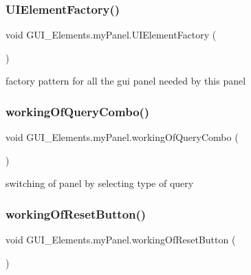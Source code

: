 \subsubsection{\texorpdfstring{U\+I\+Element\+Factory()}{UIElementFactory()}}
{\footnotesize\ttfamily void G\+U\+I\+\_\+\+Elements.\+my\+Panel.\+U\+I\+Element\+Factory (\begin{DoxyParamCaption}{ }\end{DoxyParamCaption})}



factory pattern for all the gui panel needed by this panel 

\hypertarget{class_g_u_i___elements_1_1my_panel_a35817f482730797326227422f83ff9c8}{}\label{class_g_u_i___elements_1_1my_panel_a35817f482730797326227422f83ff9c8} 
\subsubsection{\texorpdfstring{working\+Of\+Query\+Combo()}{workingOfQueryCombo()}}
{\footnotesize\ttfamily void G\+U\+I\+\_\+\+Elements.\+my\+Panel.\+working\+Of\+Query\+Combo (\begin{DoxyParamCaption}{ }\end{DoxyParamCaption})}



switching of panel by selecting type of query 

\hypertarget{class_g_u_i___elements_1_1my_panel_af937a1f734205a826ab7280987c2c420}{}\label{class_g_u_i___elements_1_1my_panel_af937a1f734205a826ab7280987c2c420} 
\subsubsection{\texorpdfstring{working\+Of\+Reset\+Button()}{workingOfResetButton()}}
{\footnotesize\ttfamily void G\+U\+I\+\_\+\+Elements.\+my\+Panel.\+working\+Of\+Reset\+Button (\begin{DoxyParamCaption}{ }\end{DoxyParamCaption})}

